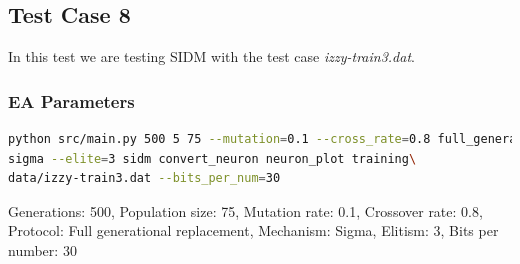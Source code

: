 \subsection{Test Case 8}\label{sec:test-case-8}
In this test we are testing SIDM with the test case
\textit{izzy-train3.dat}.
\subsubsection{EA Parameters}\label{sec:test-case-8-parameters}
\begin{lstlisting}[frame=single, language=bash, caption=Command-line to
replicate the results]
python src/main.py 500 5 75 --mutation=0.1 --cross_rate=0.8 full_generational
sigma --elite=3 sidm convert_neuron neuron_plot training\
data/izzy-train3.dat --bits_per_num=30
\end{lstlisting}
Generations: 500, Population size: 75, Mutation rate: 0.1, Crossover rate: 0.8, Protocol: Full generational replacement, Mechanism: Sigma, Elitism: 3, Bits per number: 30
